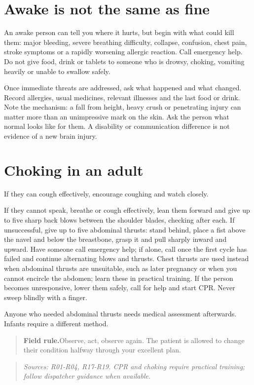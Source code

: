 \documentclass[10pt,openright]{book}
\newcommand{\fieldrule}[1]{\begin{quote}\textbf{Field rule.}\enspace #1\end{quote}}
\begin{document}
\section*{Awake is not the same as fine}
An awake person can tell you where it hurts, but begin with what could kill them: major bleeding, severe breathing difficulty, collapse, confusion, chest pain, stroke symptoms or a rapidly worsening allergic reaction. Call emergency help. Do not give food, drink or tablets to someone who is drowsy, choking, vomiting heavily or unable to swallow safely.

Once immediate threats are addressed, ask what happened and what changed. Record allergies, usual medicines, relevant illnesses and the last food or drink. Note the mechanism: a fall from height, heavy crush or penetrating injury can matter more than an unimpressive mark on the skin. Ask the person what normal looks like for them. A disability or communication difference is not evidence of a new brain injury.

\section*{Choking in an adult}
If they can cough effectively, encourage coughing and watch closely.

If they cannot speak, breathe or cough effectively, lean them forward and give up to five sharp back blows between the shoulder blades, checking after each. If unsuccessful, give up to five abdominal thrusts: stand behind, place a fist above the navel and below the breastbone, grasp it and pull sharply inward and upward. Have someone call emergency help; if alone, call once the first cycle has failed and continue alternating blows and thrusts. Chest thrusts are used instead when abdominal thrusts are unsuitable, such as later pregnancy or when you cannot encircle the abdomen; learn these in practical training. If the person becomes unresponsive, lower them safely, call for help and start CPR. Never sweep blindly with a finger.

Anyone who needed abdominal thrusts needs medical assessment afterwards. Infants require a different method.

\fieldrule{Observe, act, observe again. The patient is allowed to change their condition halfway through your excellent plan.}
\begin{quote}\emph{Sources: R01-R04, R17-R19. CPR and choking require practical training; follow dispatcher guidance when available.}\end{quote}
\end{document}

